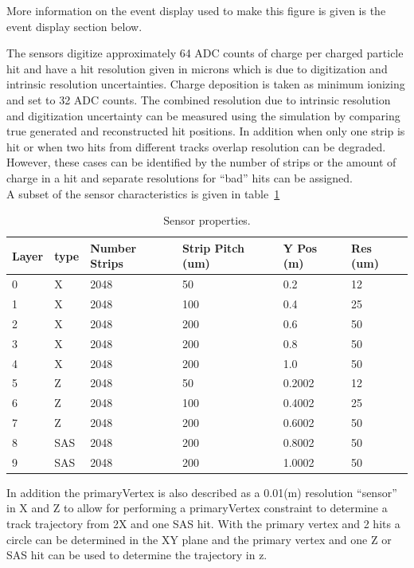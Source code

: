 \documentclass[aps,prd,superscriptaddress,floatfix]{revtex4}
\begin{document}
More information on the event display used to make this figure is
given is the event display section below.

The sensors digitize approximately 64 ADC counts of charge per charged
particle hit and have a hit resolution given in microns which is due to
digitization and intrinsic resolution uncertainties.  Charge
deposition is taken as minimum ionizing and set to 32 ADC counts.  The combined resolution
due to intrinsic resolution and digitization uncertainty can be measured using the simulation by comparing true generated and reconstructed
hit positions.  In addition when only one strip is hit or when two hits from
different tracks overlap resolution can be degraded.  However, these cases can
be identified by the number of strips or the amount of charge in a hit and separate
resolutions for ``bad'' hits can be assigned.
\\

A subset of the sensor characteristics is given in table~\ref{tab:detectorTable}
\\

\begin{table}
\caption{\label{tab:detectorTable} Sensor properties.}
\begin{tabular}{|l|l|l|l|l|l|}
\hline 
Layer & type & Number Strips & Strip Pitch (um) & Y Pos (m) & Res (um)\\
\hline
0 & X & 2048 & 50	& 0.2 & 12	 \\
1 & X & 2048 & 100	& 0.4 & 25	 \\
2 & X & 2048 & 200	& 0.6 & 50	 \\
3 & X & 2048 & 200	& 0.8 & 50	 \\
4 & X & 2048 & 200	& 1.0 & 50	 \\
5 & Z & 2048 & 50	& 0.2002 & 12	 \\
6 & Z & 2048 & 100	& 0.4002 & 25	 \\
7 & Z & 2048 & 200	& 0.6002 & 50	 \\
8 & SAS & 2048 & 200	& 0.8002 & 50	 \\
9 & SAS & 2048 & 200	& 1.0002 & 50	 \\
\hline
\end{tabular}
\end{table}

In addition the primaryVertex is also described as a 0.01(m) resolution ``sensor'' in X and Z to allow
for performing a primaryVertex constraint to determine a track trajectory from 2X and one SAS
hit.  With the primary vertex and 2 hits a circle can be determined in the XY plane and the primary
vertex and one Z or SAS hit can be used to determine the trajectory in z.
\end{document}
